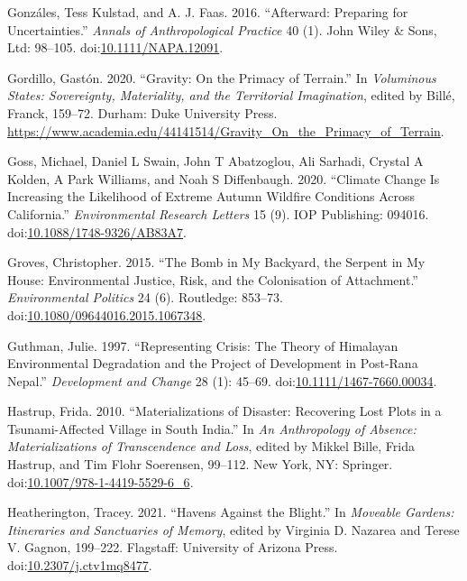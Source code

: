 \documentclass[
]{article}
\newlength{\cslhangindent}
\newenvironment{CSLReferences}[2] %
 {\begin{list}{}{%
  \setlength{\itemindent}{0pt}
  \setlength{\leftmargin}{0pt}
  \setlength{\parsep}{0pt}
  \ifodd #1
   \setlength{\leftmargin}{\cslhangindent}
   \setlength{\itemindent}{-1\cslhangindent}
  \fi
  \setlength{\itemsep}{#2\baselineskip}}}
 {\end{list}}
\begin{document}
\begin{CSLReferences}{1}{0}
Gonzáles, Tess Kulstad, and A. J. Faas. 2016. {``Afterward: {Preparing} for Uncertainties.''} \emph{Annals of Anthropological Practice} 40 (1). John Wiley \& Sons, Ltd: 98--105. doi:\href{https://doi.org/10.1111/NAPA.12091}{10.1111/NAPA.12091}.

Gordillo, Gastón. 2020. {``Gravity: {On} the {Primacy} of {Terrain}.''} In \emph{Voluminous {States}: {Sovereignty}, {Materiality}, and the {Territorial Imagination}}, edited by Billé, Franck, 159--72. Durham: Duke University Press. \url{https://www.academia.edu/44141514/Gravity_On_the_Primacy_of_Terrain}.

Goss, Michael, Daniel L Swain, John T Abatzoglou, Ali Sarhadi, Crystal A Kolden, A Park Williams, and Noah S Diffenbaugh. 2020. {``Climate Change Is Increasing the Likelihood of Extreme Autumn Wildfire Conditions Across {California}.''} \emph{Environmental Research Letters} 15 (9). IOP Publishing: 094016. doi:\href{https://doi.org/10.1088/1748-9326/AB83A7}{10.1088/1748-9326/AB83A7}.

Groves, Christopher. 2015. {``The Bomb in My Backyard, the Serpent in My House: Environmental Justice, Risk, and the Colonisation of Attachment.''} \emph{Environmental Politics} 24 (6). Routledge: 853--73. doi:\href{https://doi.org/10.1080/09644016.2015.1067348}{10.1080/09644016.2015.1067348}.

Guthman, Julie. 1997. {``Representing {Crisis}: {The Theory} of {Himalayan Environmental Degradation} and the {Project} of {Development} in {Post-Rana Nepal}.''} \emph{Development and Change} 28 (1): 45--69. doi:\href{https://doi.org/10.1111/1467-7660.00034}{10.1111/1467-7660.00034}.

Hastrup, Frida. 2010. {``Materializations of {Disaster}: {Recovering Lost Plots} in a {Tsunami-Affected Village} in {South India}.''} In \emph{An {Anthropology} of {Absence}: {Materializations} of {Transcendence} and {Loss}}, edited by Mikkel Bille, Frida Hastrup, and Tim Flohr Soerensen, 99--112. New York, NY: Springer. doi:\href{https://doi.org/10.1007/978-1-4419-5529-6_6}{10.1007/978-1-4419-5529-6\_6}.

Heatherington, Tracey. 2021. {``Havens Against the {Blight}.''} In \emph{Moveable {Gardens}: {Itineraries} and {Sanctuaries} of {Memory}}, edited by Virginia D. Nazarea and Terese V. Gagnon, 199--222. Flagstaff: University of Arizona Press. doi:\href{https://doi.org/10.2307/j.ctv1mq8477}{10.2307/j.ctv1mq8477}.


\end{CSLReferences}
\end{document}
